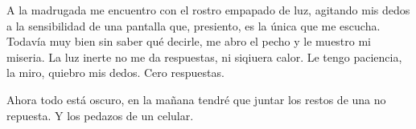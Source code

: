 
A la madrugada me encuentro con el rostro empapado de luz, agitando mis dedos
a la sensibilidad de una pantalla que, presiento, es la única que me escucha.
Todavía muy bien sin saber qué decirle, me abro el pecho y le muestro mi 
miseria. La luz inerte no me da respuestas, ni siqiuera calor. Le tengo
paciencia, la miro, quiebro mis dedos. Cero respuestas.

Ahora todo está oscuro, en la mañana tendré que juntar los restos de una no
repuesta. Y los pedazos de un celular.
